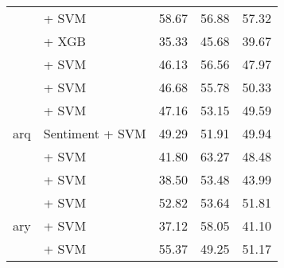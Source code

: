 \begin{sidewaystable}[h]
{\begin{tabular}{llccc}
                                               & \citep{rasyosef2025llamaamharic} + SVM                             & 58.67                                & 56.88              & 57.32             \\
                                               & \citep{rasyosef2025robertaamharic} + XGB                           & 35.33                                & 45.68              & 39.67             \\
                                               & \citep{rasyosef2025robertaamharic} + SVM                           & 46.13                                & 56.56              & 47.97             \\
            \midrule
            \multirow{5}{*}{arq}               & \citep{arabert} + SVM                                              & 46.68                                & 55.78              & 50.33             \\
                                               & \citep{dziribert} + SVM                                            & 47.16                                & 53.15              & 49.59             \\
                                               & \citep{dziribert} Sentiment + SVM                                  & 49.29                                & 51.91              & 49.94             \\
                                               & \citep{wang2024multilingual} + SVM                                 & 41.80                                & 63.27              & 48.48             \\
                                               & \citep{nacar2025GATE} + SVM                                        & 38.50                                & 53.48              & 43.99             \\
            \midrule
            \multirow{4}{*}{ary}               & \citep{safaya-etal-2020-kuisail} + SVM                             & 52.82                                & 53.64              & 51.81             \\
                                               & \citep{gaanoun2023darijabert} + SVM                                & 37.12                                & 58.05              & 41.10             \\
                                               & \citep{wang2024multilingual} + SVM                                 & 55.37                                & 49.25              & 51.17             \\

\end{tabular}}
\end{sidewaystable}
